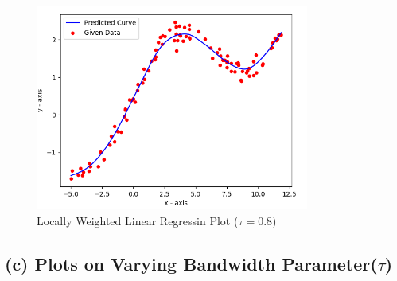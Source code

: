 \documentclass[a4 paper]{article}
\begin{document}
\begin{figure}[H]
	\centering
	\includegraphics[width = 90mm]{./Plots/2b(08).png}
	\caption{Locally Weighted Linear Regressin Plot ($\tau = 0.8$)}
  	\label{fig2}
\end{figure}

\vspace*{-0.5cm}
\subsection*{(c) Plots on Varying Bandwidth Parameter($\tau$)}

\vspace*{-0.7cm}
\begin{figure}[H]
	\centering
    \begin{floatrow}
	\hspace*{-0.4in}
    \end{floatrow}
\end{figure}
\end{document}
